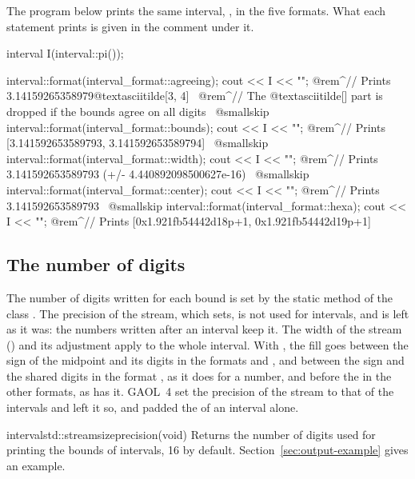 \documentclass[12pt,a4paper,twoside,openright]{book}
\begin{document}
\begin{Ex}
The program below prints the same interval, , in the
five formats. What each statement prints is given in the comment under it.
\begin{example}
  interval I(interval::pi());

  interval::format(interval_format::agreeing);
  cout << I << "\n";
  @rem^// Prints 3.14159265358979@textasciitilde[3, 4]~
  @rem^// The @textasciitilde[] part is dropped if the bounds agree on all digits~
  @smallskip
  interval::format(interval_format::bounds);
  cout << I << "\n";
  @rem^// Prints [3.141592653589793, 3.141592653589794]~
  @smallskip
  interval::format(interval_format::width);
  cout << I << "\n";
  @rem^// Prints 3.141592653589793 (+/- 4.440892098500627e-16)~
  @smallskip
  interval::format(interval_format::center);
  cout << I << "\n";
  @rem^// Prints 3.141592653589793~
  @smallskip
  interval::format(interval_format::hexa);
  cout << I << "\n";
  @rem^// Prints [0x1.921fb54442d18p+1, 0x1.921fb54442d19p+1]~
\end{example}
\end{Ex}

\subsection{The number of digits}

The number of digits written for each bound is set by the static method
 of the class . The precision of the
stream, which  sets, is not used for intervals, and
is left as it was: the numbers written after an interval keep it. The width
of the stream () and its adjustment apply to the whole
interval. With , the fill goes between the sign of the
midpoint and its digits in the formats  and ,
and between the sign and the shared digits in the format ,
as it does for a number, and before the \code{[} in the other formats, as
 has it.\newinvfive{} GAOL~4 set the precision of the
stream to that of the intervals and left it so, and  padded
the \code{[} of an interval alone.
%

\begin{defstaticmethod}{interval}{std::streamsize}{precision}{(void)}
  Returns the number of digits used for printing the bounds of intervals,
  16 by default. Section~\ref{sec:output-example} gives an example.
\end{defstaticmethod}
\end{document}
